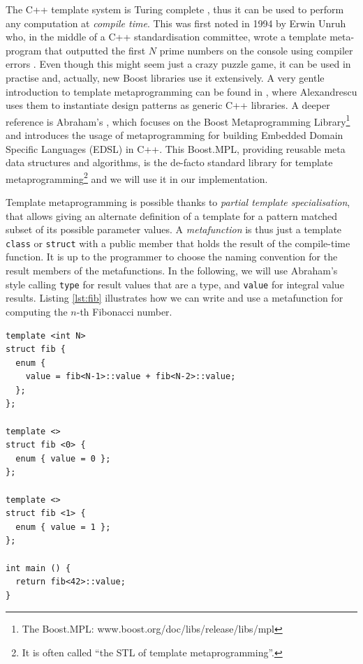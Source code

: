 The C++ template system is Turing complete
\cite{veldhuizen03templates}, thus it can be used to perform any
computation at \emph{compile time}. This was first noted in 1994 by
Erwin Unruh who, in the middle of a C++ standardisation committee,
wrote a template meta-program that outputted the first $N$ prime
numbers on the console using compiler errors \cite{unruh94prime}. Even
though this might seem just a crazy puzzle game, it can be used in
practise and, actually, new Boost libraries use it extensively. A very
gentle introduction to template metaprogramming can be found in
\cite{alexandrescu01modern}, where Alexandrescu uses them to
instantiate design patterns as generic C++ libraries. A deeper
reference is Abraham's \cite{abrahams04meta}, which focuses on the
Boost Metaprogramming Library\footnote{The Boost.MPL:
  www.boost.org/doc/libs/release/libs/mpl} and introduces the usage of
metaprogramming for building Embedded Domain Specific Languages (EDSL)
in C++. This Boost.MPL, providing reusable meta data structures and
algorithms, is the de-facto standard library for template
metaprogramming\footnote{It is often called ``the STL of template
  metaprogramming''.} and we will use it in our implementation.

Template metaprogramming is possible thanks to \emph{partial template
  specialisation}, that allows giving
an alternate definition of a template for a pattern matched subset of
its possible parameter values. A
\emph{metafunction} is thus just a template
\texttt{class} or \texttt{struct} with a public member that holds the
result of the compile-time function. It is up to the programmer to
choose the naming convention for the result members of the
metafunctions. In the following, we will use Abraham's style calling
\texttt{type} for result values that are a type, and \texttt{value}
for integral value results. Listing \ref{lst:fib} illustrates how 
we can write and use a metafunction for computing the $n$-th Fibonacci
number.

\begin{lstlisting}[float=h!, 
  caption=Metaprogram for computing the Nth Fibonacci number,
  label=lst:fib]
template <int N>
struct fib {
  enum { 
    value = fib<N-1>::value + fib<N-2>::value; 
  };
};

template <>
struct fib <0> {
  enum { value = 0 };
};

template <>
struct fib <1> {
  enum { value = 1 };
};

int main () {
  return fib<42>::value;
}  
\end{lstlisting}

